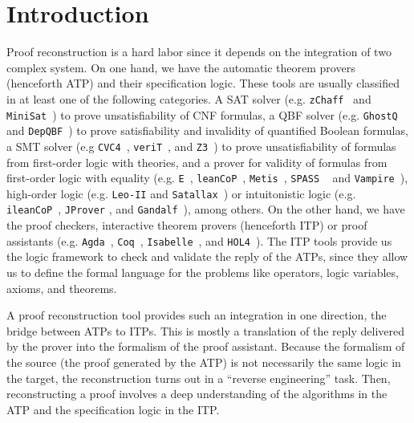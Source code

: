 \documentclass[main.tex]{subfiles}
\begin{document}

\section{Introduction}
\label{sec:introduction}

Proof reconstruction is a hard labor since it depends on the integration
of two complex system. On one hand, we have the automatic theorem provers
(henceforth ATP) and their specification logic. These tools are usually
classified in at least one of the following categories. A SAT solver
(e.g. \verb!zChaff!~\cite{Moskewicz2001} and \verb!MiniSat!~\cite{Een2004})
to prove unsatisfiability of CNF formulas, a QBF solver
(e.g. \verb!GhostQ!~\cite{Klieber2014} and \verb!DepQBF!~\cite{Lonsing2017})
to prove satisfiability and invalidity of quantified Boolean formulas, a SMT
solver (e.g \verb!CVC4!~\cite{Barrett2011}, \verb!veriT!~\cite{bouton2009},
and \verb!Z3!~\cite{DeMoura2008}) to prove unsatisfiability of formulas
from first-order logic with theories, and a prover for validity of
formulas from first-order logic with equality
(e.g. \verb!E!~\cite{Schulz:AICOM-2002}, \verb!leanCoP!~\cite{Otten2008},
\verb!Metis!~\cite{hurd2003first}, \verb!SPASS! ~\cite{Weidenbach2009} and
\verb!Vampire!~\cite{Riazanov1999}), high-order logic (e.g. \verb!Leo-II!
\cite{Benzmuller2008} and \verb!Satallax!~\cite{Brown2012}) or intuitonistic
logic (e.g. \verb!ileanCoP!~\cite{Otten2008}, \verb!JProver!
\cite{Schmitt2001}, and \verb!Gandalf!~\cite{Tammet1997}), among others.
On the other hand, we have the proof checkers, interactive theorem provers
(henceforth ITP) or proof assistants (e.g. \verb!Agda!~\cite{agdateam},
\verb!Coq!~\cite{coqteam}, \verb!Isabelle!~\cite{paulson1994isabelle}, and
\verb!HOL4!~\cite{norrish2007hol}).
The ITP tools provide us the logic framework to check and validate the
reply of the ATPs, since they allow us to define the formal language for
the problems like operators, logic variables, axioms, and theorems.

A proof reconstruction tool provides such an integration in one
direction, the bridge between ATPs to ITPs. This is mostly a translation
of the reply delivered by the prover into the formalism of the proof
assistant. Because the formalism of the source (the proof generated by
the ATP) is not necessarily the same logic in the target, the
reconstruction turns out in a ``reverse engineering'' task. Then,
reconstructing a proof involves a deep understanding of the algorithms in
the ATP and the specification logic in the ITP.
\end{document}
